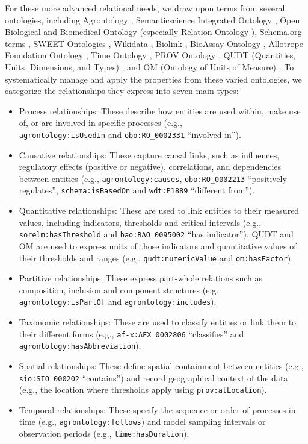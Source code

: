 \documentclass[preprint,12pt]{elsarticle}
\begin{document}
For these more advanced relational needs, we draw upon terms from several ontologies, including Agrontology \citep{SUBIRATSCOLL2022105965}, Semanticscience Integrated Ontology \citep{Dumontier2014}, Open Biological and Biomedical Ontology \citep{Smith2007} (especially Relation Ontology \citep{Smith2005}), Schema.org terms \citep{10.1145/2844544}, SWEET Ontologies \citep{RASKIN20051119}, Wikidata \citep{10.1145/2629489}, Biolink \citep{https://doi.org/10.1111/cts.13302}, BioAssay Ontology \citep{Visser2011-up}, Allotrope Foundation Ontology \citep{MILLECAM20211922}, Time Ontology \citep{10.1145/1017068.1017073}, PROV Ontology \citep{lebo2013prov}, QUDT (Quantities, Units, Dimensions, and Types) \citep{fairsharing_qudt_2025}, and OM (Ontology of Units of Measure) \citep{doi:10.3233/SW-2012-0069}. To systematically manage and apply the properties from these varied ontologies, we categorize the relationships they express into seven main types:

\begin{itemize}
    \item Process relationships: These describe how entities are used within, make use of, or are involved in specific processes (e.g., \\\texttt{agrontology:isUsedIn} and \texttt{obo:RO\_0002331} ``involved in'').
    \item Causative relationships: These capture causal links, such as influences, regulatory effects (positive or negative), correlations, and dependencies between entities (e.g., \texttt{agrontology:causes}, \texttt{obo:RO\_0002213} ``positively regulates'', \texttt{schema:isBasedOn} and \texttt{wdt:P1889} ``different from'').
    \item Quantitative relationships: These are used to link entities to their measured values, including indicators, thresholds and critical intervals (e.g., \texttt{sorelm:hasThreshold} and \texttt{bao:BAO\_0095002} ``has indicator''). QUDT and OM are used to express units of those indicators and quantitative values of their thresholds and ranges (e.g., \texttt{qudt:numericValue} and \texttt{om:hasFactor}).
    \item Partitive relationships: These express part-whole relations such as composition, inclusion and component structures (e.g., \\\texttt{agrontology:isPartOf} and \texttt{agrontology:includes}).
    \item Taxonomic relationships: These are used to classify entities or link them to their different forms (e.g., \texttt{af-x:AFX\_0002806} ``classifies'' and \texttt{agrontology:hasAbbreviation}).
    \item Spatial relationships: These define spatial containment between entities (e.g., \texttt{sio:SIO\_000202} ``contains'') and record geographical context of the data (e.g., the location where thresholds apply using \texttt{prov:atLocation}).
    \item Temporal relationships: These specify the sequence or order of processes in time (e.g., \texttt{agrontology:follows}) and model sampling intervals or observation periods (e.g., \texttt{time:hasDuration}).
\end{itemize}
\end{document}

